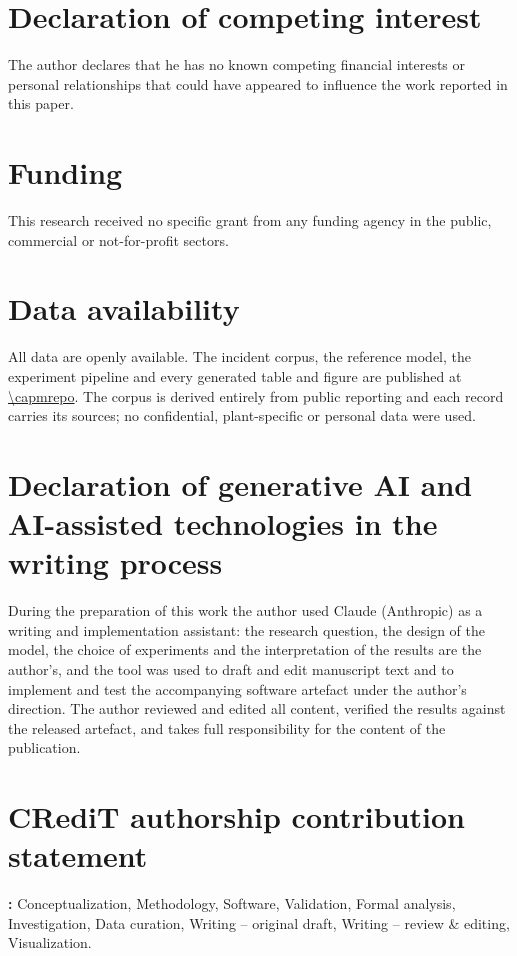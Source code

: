 \section*{Declaration of competing interest}

The author declares that he has no known competing financial interests or
personal relationships that could have appeared to influence the work reported
in this paper.

\section*{Funding}

This research received no specific grant from any funding agency in the public,
commercial or not-for-profit sectors.

\section*{Data availability}

All data are openly available. The incident corpus, the reference model, the
experiment pipeline and every generated table and figure are published at
\url{\capmrepo}. The corpus is derived entirely from public reporting and each
record carries its sources; no confidential, plant-specific or personal data
were used.

\section*{Declaration of generative AI and AI-assisted technologies in the writing process}

During the preparation of this work the author used Claude (Anthropic) as a
writing and implementation assistant: the research question, the design of the
model, the choice of experiments and the interpretation of the results are the
author's, and the tool was used to draft and edit manuscript text and to
implement and test the accompanying software artefact under the author's
direction. The author reviewed and edited all content, verified the results
against the released artefact, and takes full responsibility for the content of
the publication.

\section*{CRediT authorship contribution statement}

\textbf{\capmauthor:} Conceptualization, Methodology, Software, Validation,
Formal analysis, Investigation, Data curation, Writing -- original draft,
Writing -- review \& editing, Visualization.
